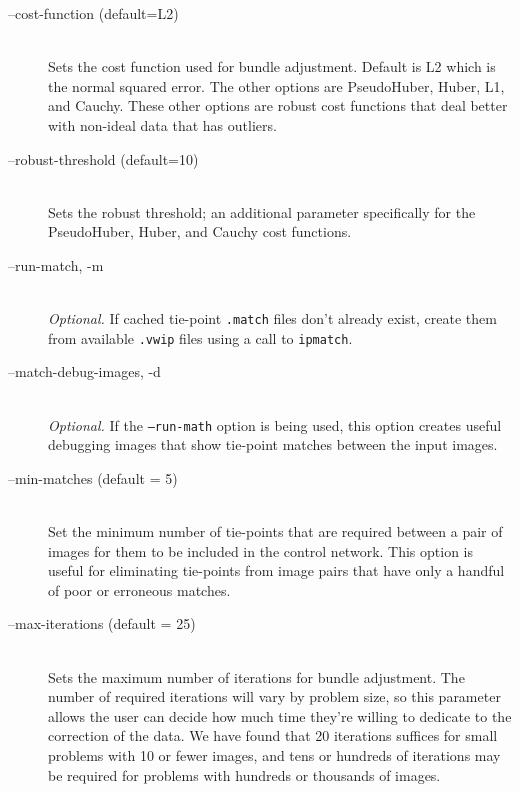 \begin{description}
\item[--cost-function \textnormal{\small{(default=L2)}}] \hfill \\

  Sets the cost function used for bundle adjustment. Default is L2
  which is the normal squared error. The other options are
  PseudoHuber, Huber, L1, and Cauchy. These other options are robust
  cost functions that deal better with non-ideal data that has
  outliers.

\item[--robust-threshold \textnormal{\small{(default=10)}}] \hfill \\

  Sets the robust threshold; an additional parameter specifically for
  the PseudoHuber, Huber, and Cauchy cost functions.

\item[--run-match, -m] \hfill \\

  \emph{Optional.} If cached tie-point {\tt *.match} files don't
  already exist, create them from available {\tt *.vwip} files using a
  call to \texttt{ipmatch}.

\item[--match-debug-images, -d] \hfill \\

  \emph{Optional.} If the {\tt --run-math} option is being used, this
  option creates useful debugging images that show tie-point matches
  between the input images.

\item[--min-matches \textnormal{\small{(default = 5)}}] \hfill \\

  Set the minimum number of tie-points that are required between a
  pair of images for them to be included in the control network. This
  option is useful for eliminating tie-points from image pairs that
  have only a handful of poor or erroneous matches.

\item[--max-iterations \textnormal{\small{(default = 25)}}] \hfill \\

  Sets the maximum number of iterations for bundle adjustment. The
  number of required iterations will vary by problem size, so this
  parameter allows the user can decide how much time they're willing
  to dedicate to the correction of the data.  We have found that 20
  iterations suffices for small problems with 10 or fewer images, and
  tens or hundreds of iterations may be required for problems with
  hundreds or thousands of images.


\end{description}
